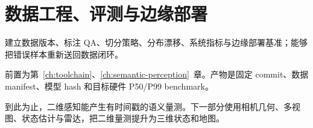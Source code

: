 \chapter{数据工程、评测与边缘部署}
\label{ch:data-deployment}

\begin{learningobjectives}
建立数据版本、标注 QA、切分策略、分布漂移、系统指标与边缘部署基准；能够把错误样本重新送回数据闭环。
\end{learningobjectives}

\begin{prerequisites}
前置为第~\ref{ch:toolchain}、\ref{ch:semantic-perception}~章。产物是固定 commit、数据 manifest、模型 hash 和目标硬件 P50/P99 benchmark。
\end{prerequisites}


\begin{chaptertransition}
到此为止，二维感知能产生有时间戳的语义量测。下一部分使用相机几何、多视图、状态估计与雷达，把二维量测提升为三维状态和地图。
\end{chaptertransition}


